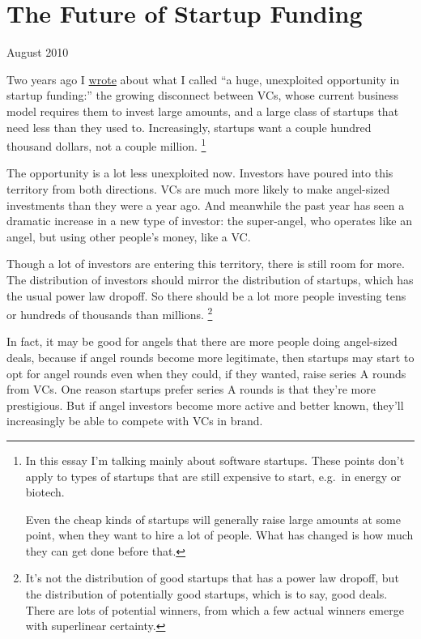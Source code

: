 \chapter{The Future of Startup Funding }

August 2010

Two years ago I
\href{http://www.paulgraham.com/googles.html\#next}{wrote} about what I
called ``a huge, unexploited opportunity in startup funding:'' the
growing disconnect between VCs, whose current business model requires
them to invest large amounts, and a large class of startups that need
less than they used to. Increasingly, startups want a couple hundred
thousand dollars, not a couple million. \footnote{In this essay I'm talking mainly about software startups. These
points don't apply to types of startups that are still expensive to
start, e.g.~in energy or biotech.

Even the cheap kinds of startups will generally raise large amounts at
some point, when they want to hire a lot of people. What has changed is
how much they can get done before that.}

The opportunity is a lot less unexploited now. Investors have poured
into this territory from both directions. VCs are much more likely to
make angel-sized investments than they were a year ago. And meanwhile
the past year has seen a dramatic increase in a new type of investor:
the super-angel, who operates like an angel, but using other people's
money, like a VC.

Though a lot of investors are entering this territory, there is still
room for more. The distribution of investors should mirror the
distribution of startups, which has the usual power law dropoff. So
there should be a lot more people investing tens or hundreds of
thousands than millions. \footnote{It's not the distribution of good startups that has a power law
dropoff, but the distribution of potentially good startups, which is to
say, good deals. There are lots of potential winners, from which a few
actual winners emerge with superlinear certainty.}

In fact, it may be good for angels that there are more people doing
angel-sized deals, because if angel rounds become more legitimate, then
startups may start to opt for angel rounds even when they could, if they
wanted, raise series A rounds from VCs. One reason startups prefer
series A rounds is that they're more prestigious. But if angel investors
become more active and better known, they'll increasingly be able to
compete with VCs in brand.

